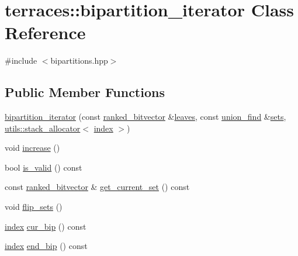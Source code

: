 \hypertarget{classterraces_1_1bipartition__iterator}{}\section{terraces\+:\+:bipartition\+\_\+iterator Class Reference}
\label{classterraces_1_1bipartition__iterator}


{\ttfamily \#include $<$bipartitions.\+hpp$>$}

\subsection*{Public Member Functions}
\begin{DoxyCompactItemize}
\item 
\hyperlink{classterraces_1_1bipartition__iterator_a5276cb73a4ee31aace8cc8424eda534f}{bipartition\+\_\+iterator} (const \hyperlink{namespaceterraces_acc45ec9c561024c50ecbce5b6738ba08}{ranked\+\_\+bitvector} \&\hyperlink{classterraces_1_1bipartition__iterator_ae3aa95923d3d8004050240f37aea6e65}{leaves}, const \hyperlink{classterraces_1_1union__find}{union\+\_\+find} \&\hyperlink{classterraces_1_1bipartition__iterator_adf63f745fee83552648553ddb0530a3b}{sets}, \hyperlink{classterraces_1_1utils_1_1stack__allocator}{utils\+::stack\+\_\+allocator}$<$ \hyperlink{namespaceterraces_adbc33ccb543d1634e96d0eb02e472c77}{index} $>$)
\item 
void \hyperlink{classterraces_1_1bipartition__iterator_ac072beaef1deb4144217036e5595f4cb}{increase} ()
\item 
bool \hyperlink{classterraces_1_1bipartition__iterator_a6daf5b56669a4df0f1ed2878512c343b}{is\+\_\+valid} () const
\item 
const \hyperlink{namespaceterraces_acc45ec9c561024c50ecbce5b6738ba08}{ranked\+\_\+bitvector} \& \hyperlink{classterraces_1_1bipartition__iterator_abc68c2054681504c6e99e261b47cd22f}{get\+\_\+current\+\_\+set} () const
\item 
void \hyperlink{classterraces_1_1bipartition__iterator_aa8f7242cbf825373196f3fc16b28cfcd}{flip\+\_\+sets} ()
\item 
\hyperlink{namespaceterraces_adbc33ccb543d1634e96d0eb02e472c77}{index} \hyperlink{classterraces_1_1bipartition__iterator_afc11c289f64dd48723ff88e70d67af37}{cur\+\_\+bip} () const
\item 
\hyperlink{namespaceterraces_adbc33ccb543d1634e96d0eb02e472c77}{index} \hyperlink{classterraces_1_1bipartition__iterator_ad73b80dd148b3d236877f812e7ff6fec}{end\+\_\+bip} () const

\end{DoxyCompactItemize}

